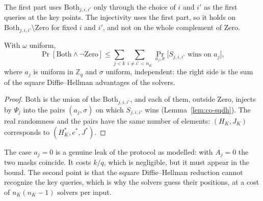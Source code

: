 The first part uses $\mathrm{Both}_{j,i,i'}$ only through the choice of $i$ and $i'$ as the first
queries at the key points. The injectivity uses the first part, so it holds on
$\mathrm{Both}_{j,i,i'} \setminus \mathrm{Zero}$ for fixed $i$ and $i'$, and not on the whole
complement of $\mathrm{Zero}$.

\begin{corollary}
  \label{cor:co-sqdh}
  \leanok
  With $\omega$ uniform,
  \[ \Pr[\mathrm{Both} \wedge \neg\mathrm{Zero}] \le \sum_{j < k} \sum_{i \neq i' < n_K}
     \Pr_{a_j, \sigma}\bigl[S_{j,i,i'} \text{ wins on } a_j\bigr], \]
  where $a_j$ is uniform in $\mathbb{Z}_q$ and $\sigma$ uniform, independent: the right side is the
  sum of the square Diffie--Hellman advantages of the solvers.
\end{corollary}

\begin{proof}
  \leanok
  $\mathrm{Both}$ is the union of the $\mathrm{Both}_{j,i,i'}$, and each of them, outside
  $\mathrm{Zero}$, injects by $\Psi_j$ into the pairs $(a_j, \sigma)$ on which $S_{j,i,i'}$ wins
  (Lemma~\ref{lem:co-sqdh}). The real randomness and the pairs have the same number of elements:
  $(H_K, J_K)$ corresponds to $(H_K^*, e^*, J^*)$.
\end{proof}

\begin{remark}
  The case $a_j = 0$ is a genuine leak of the protocol as modelled: with $A_j = 0$ the two masks
  coincide. It costs $k/q$, which is negligible, but it must appear in the bound. The second point is
  that the square Diffie--Hellman reduction cannot recognize the key queries, which is why the
  solvers guess their positions, at a cost of $n_K (n_K - 1)$ solvers per input.
\end{remark}
